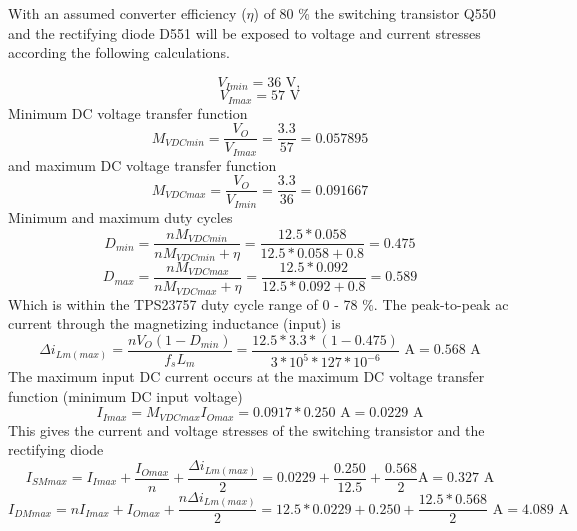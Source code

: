 With an assumed converter efficiency ($\eta$) of 80 \% the switching
transistor Q550 and the rectifying diode D551 will be exposed to
voltage and current stresses according the following calculations.

\begin{equation}
V_{Imin}=36 \text{ V}, 
\end{equation}
\begin{equation}
V_{Imax}=57 \text{ V}
\end{equation}
Minimum DC voltage transfer function
\begin{equation}
M_{V DCmin}=\frac{V_O}{V_{Imax}}=\frac{3.3}{57}=0.057895
\end{equation}
and maximum DC voltage transfer function
\begin{equation}
M_{V DCmax}=\frac{V_O}{V_{Imin}}=\frac{3.3}{36}=0.091667
\end{equation}
Minimum and maximum duty cycles
\begin{equation}
D_{min}=\frac{nM_{V DCmin}}{nM_{V DCmin}+\eta}=\frac{12.5*0.058}{12.5*0.058+0.8}=0.475
\end{equation}
\begin{equation}
D_{max}=\frac{nM_{V DCmax}}{nM_{V DCmax}+\eta}=\frac{12.5*0.092}{12.5*0.092+0.8}=0.589
\end{equation}
Which is within the TPS23757 duty cycle range of 0 - 78 \%. The
peak-to-peak ac current through the magnetizing inductance (input) is
\begin{equation}
\Delta i_{Lm(max)}=\frac{nV_O (1-D_{min})}{f_s L_m}
= \frac{12.5*3.3*(1-0.475)}{3*10^5*127*10^{-6}} \text{ A} = 0.568 \text{ A}
\end{equation}
The maximum input DC current occurs at the maximum DC voltage transfer
function (minimum DC input voltage)
\begin{equation}
I_{Imax}=M_{V DCmax}I_{Omax} = 0.0917 * 0.250 \text{ A} =
0.0229 \text{ A}
\end{equation}
This gives the current and voltage stresses of the switching
transistor and the rectifying diode
\begin{equation}
I_{SMmax} = I_{Imax} + \frac{I_{Omax}}{n} + \frac{\Delta
i_{Lm(max)}}{2} = 0.0229 + \frac{0.250}{12.5} + \frac{0.568}{2} \text{
A} = 
0.327 \text{ A}
\end{equation}
\begin{equation}
I_{DMmax} = nI_{Imax} + I_{Omax} + \frac{n\Delta i_{Lm(max)}}{2} = 
12.5*0.0229 + 0.250 + \frac{12.5*0.568}{2} \text{ A} = 4.089 \text{ A}
\end{equation}

